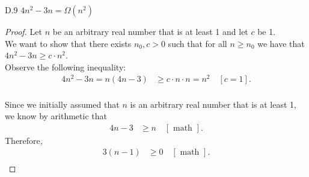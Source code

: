 \documentclass[10pt]{article}
\begin{document}
\begin{enumerate}[label={}]
            D.9 $4 n^2-3 n=\Omega\left(n^2\right)$
            \begin{proof}
                  Let $n$ be an arbitrary real number that is at least 1 and let $c$ be 1.\\
                  We want to show that there exists $n_0, c > 0$ such that for all $n\geq n_0$ we have that $4 n^2-3 n\geq c \cdot n^2$.\\
                  Observe the following inequality:\\
                  $$
                        \begin{aligned}
                              4 n^2-3 n=n(4 n-3) & \geq c \cdot n \cdot n = n^2 \quad[c=1]. \\
                        \end{aligned}
                  $$

                  Since we initially assumed that $n$ is an arbitrary real number that is at least 1, we know by arithmetic that
                  $$
                        \begin{aligned}
                              4 n-3 & \geq n \quad[\text { math }].
                        \end{aligned}
                  $$
                  Therefore,
                  $$
                        \begin{aligned}
                              3 (n-1) & \geq 0 \quad[\text { math }]. \\
                        \end{aligned}
                  $$


\end{proof}
\end{enumerate}
\end{document}
